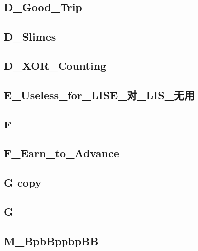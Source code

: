 \subsection{D\_Good\_Trip}
\raggedbottom
\hrulefill

\subsection{D\_Slimes}
\raggedbottom
\hrulefill

\subsection{D\_XOR\_Counting}
\raggedbottom
\hrulefill

\subsection{E\_Useless\_for\_LISE\_对\_LIS\_无用}
\raggedbottom
\hrulefill

\subsection{F}
\raggedbottom
\hrulefill

\subsection{F\_Earn\_to\_Advance}
\raggedbottom
\hrulefill

\subsection{G copy}
\raggedbottom
\hrulefill

\subsection{G}
\raggedbottom
\hrulefill

\subsection{M\_BpbBppbpBB}
\raggedbottom
\hrulefill

